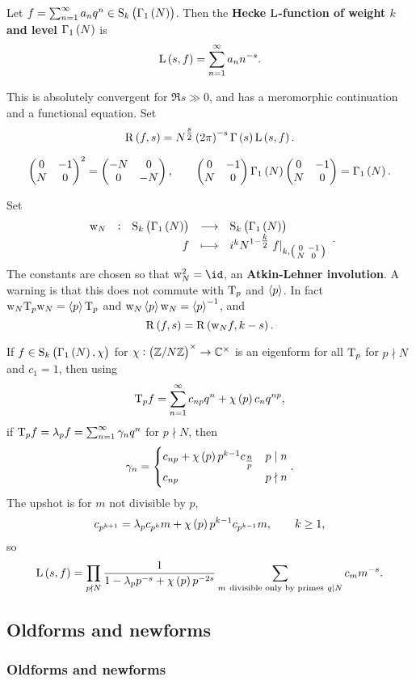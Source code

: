 \begin{definition}
Let $ f = \sum_{n = 1}^\infty a_nq^n \in \S_k\br{\Gamma_1\br{N}} $. Then the \textbf{Hecke $ \mathrm{L} $-function of weight $ k $ and level $ \Gamma_1\br{N} $} is
$$ \L\br{s, f} = \sum_{n = 1}^\infty a_nn^{-s}. $$
\end{definition}

This is absolutely convergent for $ \Re s \gg 0 $, and has a meromorphic continuation and a functional equation. Set
$$ \R\br{f, s} = N^{\tfrac{s}{2}}\br{2\pi}^{-s}\Gamma\br{s}\L\br{s, f}. $$

\begin{note*}
$$ \twobytwo{0}{-1}{N}{0}^2 = \twobytwo{-N}{0}{0}{-N}, \qquad \twobytwo{0}{-1}{N}{0}\Gamma_1\br{N}\twobytwo{0}{-1}{N}{0} = \Gamma_1\br{N}. $$
\end{note*}

Set
$$ \function[\w_N]{\S_k\br{\Gamma_1\br{N}}}{\S_k\br{\Gamma_1\br{N}}}{f}{i^kN^{1 - \tfrac{k}{2}}\eval{f}_{k, \twobytwosmall{0}{-1}{N}{0}}}. $$
The constants are chosen so that $ \w_N^2 = \id $, an \textbf{Atkin-Lehner involution}. A warning is that this does not commute with $ \mathrm{T}_p $ and $ \left\langle p \right\rangle $. In fact $ \mathrm{w}_N\mathrm{T}_p\mathrm{w}_N = \left\langle p \right\rangle\mathrm{T}_p $ and $ \mathrm{w}_N\left\langle p \right\rangle\mathrm{w}_N = \left\langle p \right\rangle^{-1} $, and
$$ \R\br{f, s} = \R\br{\w_Nf, k - s}. $$

If $ f \in \S_k\br{\Gamma_1\br{N}, \chi} $ for $ \chi : \unit{N} \to \CC^\times $ is an eigenform for all $ \mathrm{T}_p $ for $ p \nmid N $ and $ c_1 = 1 $, then using
$$ \T_pf = \sum_{n = 1}^\infty c_{np}q^n + \chi\br{p}c_nq^{np}, $$
if $ \mathrm{T}_pf = \lambda_pf = \sum_{n = 1}^\infty \gamma_nq^n $ for $ p \nmid N $, then
$$ \gamma_n =
\begin{cases}
c_{np} + \chi\br{p}p^{k - 1}c_{\tfrac{n}{p}} & p \mid n \\
c_{np} & p \nmid n
\end{cases}.
$$
The upshot is for $ m $ not divisible by $ p $,
$$ c_{p^{k + 1}} = \lambda_pc_{p^k}m + \chi\br{p}p^{k - 1}c_{p^{k - 1}}m, \qquad k \ge 1, $$
so
$$ \L\br{s, f} = \prod_{p \nmid N} \dfrac{1}{1 - \lambda_pp^{-s} + \chi\br{p}p^{-2s}}\sum_{m \ \text{divisible only by primes} \ q \mid N} c_mm^{-s}. $$

\subsection{Oldforms and newforms}

\subsubsection{Oldforms and newforms}

